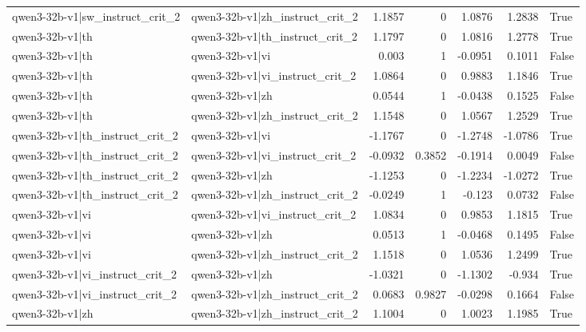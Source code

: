 \begin{table}
\begin{tabular}{l l r r r r l}
qwen3-32b-v1|sw_instruct_crit_2 & qwen3-32b-v1|zh_instruct_crit_2 & 1.1857 & 0 & 1.0876 & 1.2838 & True \\
qwen3-32b-v1|th & qwen3-32b-v1|th_instruct_crit_2 & 1.1797 & 0 & 1.0816 & 1.2778 & True \\
qwen3-32b-v1|th & qwen3-32b-v1|vi & 0.003 & 1 & -0.0951 & 0.1011 & False \\
qwen3-32b-v1|th & qwen3-32b-v1|vi_instruct_crit_2 & 1.0864 & 0 & 0.9883 & 1.1846 & True \\
qwen3-32b-v1|th & qwen3-32b-v1|zh & 0.0544 & 1 & -0.0438 & 0.1525 & False \\
qwen3-32b-v1|th & qwen3-32b-v1|zh_instruct_crit_2 & 1.1548 & 0 & 1.0567 & 1.2529 & True \\
qwen3-32b-v1|th_instruct_crit_2 & qwen3-32b-v1|vi & -1.1767 & 0 & -1.2748 & -1.0786 & True \\
qwen3-32b-v1|th_instruct_crit_2 & qwen3-32b-v1|vi_instruct_crit_2 & -0.0932 & 0.3852 & -0.1914 & 0.0049 & False \\
qwen3-32b-v1|th_instruct_crit_2 & qwen3-32b-v1|zh & -1.1253 & 0 & -1.2234 & -1.0272 & True \\
qwen3-32b-v1|th_instruct_crit_2 & qwen3-32b-v1|zh_instruct_crit_2 & -0.0249 & 1 & -0.123 & 0.0732 & False \\
qwen3-32b-v1|vi & qwen3-32b-v1|vi_instruct_crit_2 & 1.0834 & 0 & 0.9853 & 1.1815 & True \\
qwen3-32b-v1|vi & qwen3-32b-v1|zh & 0.0513 & 1 & -0.0468 & 0.1495 & False \\
qwen3-32b-v1|vi & qwen3-32b-v1|zh_instruct_crit_2 & 1.1518 & 0 & 1.0536 & 1.2499 & True \\
qwen3-32b-v1|vi_instruct_crit_2 & qwen3-32b-v1|zh & -1.0321 & 0 & -1.1302 & -0.934 & True \\
qwen3-32b-v1|vi_instruct_crit_2 & qwen3-32b-v1|zh_instruct_crit_2 & 0.0683 & 0.9827 & -0.0298 & 0.1664 & False \\
qwen3-32b-v1|zh & qwen3-32b-v1|zh_instruct_crit_2 & 1.1004 & 0 & 1.0023 & 1.1985 & True \\
\bottomrule
\end{tabular}
\end{table}
